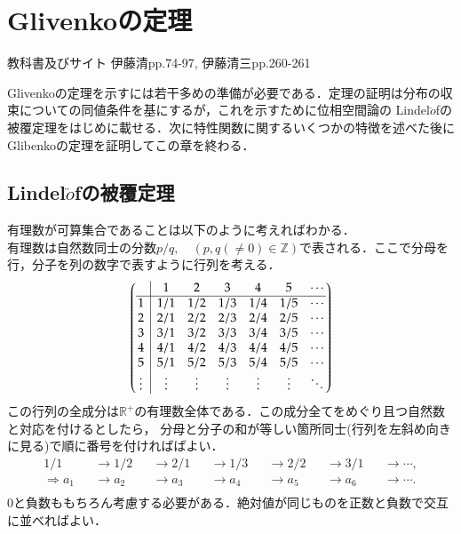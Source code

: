 \documentclass[a4j,papersize,disablejfam,slide,14pt]{jsarticle}
\begin{document}
\section{{\rm Glivenko}の定理}
\label{sec:glivenko_theorem}
	\begin{itembox}[l]{教科書及びサイト}
    	{\rm 伊藤清\cite{ito_probability}pp.74-97, 伊藤清三\cite{ito_lebesgue}pp.260-261}
    \end{itembox}
	{\rm Glivenko}の定理を示すには若干多めの準備が必要である．定理の証明は分布の収束についての同値条件を基にするが，これを示すために位相空間論の
    {\rm Lindel$\ddot{o}$f}の被覆定理をはじめに載せる．次に特性関数に関するいくつかの特徴を述べた後に{\rm Glibenko}の定理を証明してこの章を終わる．
\subsection{{\rm Lindel$\ddot{o}$f}の被覆定理}
	有理数が可算集合であることは以下のように考えればわかる．\\
    有理数は自然数同士の分数$p/q,\quad (p,q(\neq 0) \in \mathbb{Z})$で表される．ここで分母を行，分子を列の数字で表すように行列を考える．
    \begin{align}
    \arraycolsep5pt
    	\left(
    	\begin{array}{@{\,}c|cccccc@{\,}}
    		&1&2&3&4&5&\cdots\\
    		\hline
    		1&1/1&1/2&1/3&1/4&1/5&\cdots\\
    		2&2/1&2/2&2/3&2/4&2/5&\cdots\\
    		3&3/1&3/2&3/3&3/4&3/5&\cdots\\
    		4&4/1&4/2&4/3&4/4&4/5&\cdots\\
    		5&5/1&5/2&5/3&5/4&5/5&\cdots\\
    		\vdots&\vdots&\vdots&\vdots&\vdots&\vdots&\ddots\\
    	\end{array}
    	\right)
    \end{align}
    この行列の全成分は$\mathbb{R}^{+}$の有理数全体である．この成分全てをめぐり且つ自然数と対応を付けるとしたら，
    分母と分子の和が等しい箇所同士(行列を左斜め向きに見る)で順に番号を付ければばよい．
    \begin{align}
    	1/1 &&\to 1/2 &&\to 2/1 &&\to 1/3 &&\to 2/2 &&\to 3/1 &&\to \cdots, \\
        \Rightarrow a_1 &&\to a_2 &&\to a_3 &&\to a_4 &&\to a_5 &&\to a_6 &&\to \cdots. \\
    \end{align}
    $0$と負数ももちろん考慮する必要がある．絶対値が同じものを正数と負数で交互に並べればよい．
\end{document}

